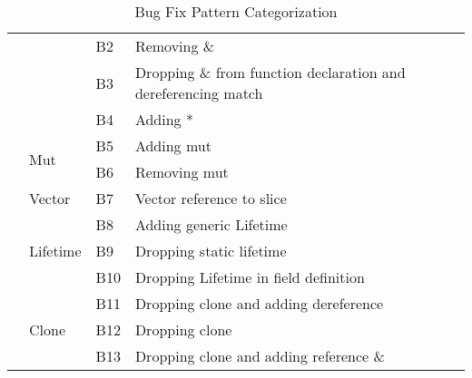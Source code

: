 \begin{table}[]
\begin{tabular}{|l|l|l|l|}
                                 &                                & B2  & Removing \&                                                         \\
                                 &                                & B3  & Dropping \& from function declaration and dereferencing match \\
                                 &                                & B4  & Adding *                                                            \\\cline{2-3}
                                 & \multirow{2}{*}{Mut}           & B5  & Adding mut                                                          \\
                                 &                                & B6  & Removing mut                                                        \\\cline{2-3}
                                 & Vector                         & B7  & Vector reference to slice                                           \\\cline{2-3}
                                 & \multirow{3}{*}{Lifetime}      & B8  & Adding generic Lifetime                                             \\
                                 &                                & B9  & Dropping static lifetime                                            \\
                                 &                                & B10 & Dropping Lifetime in field definition                               \\\cline{2-3}
                                 & \multirow{3}{*}{Clone}         & B11 & Dropping clone and adding dereference                               \\
                                 &                                & B12 & Dropping clone                                                      \\
                                 &                                & B13 & Dropping clone and adding reference  \& 

\end{tabular}
\caption{\label{fig:category}Bug Fix Pattern Categorization}
\end{table}
